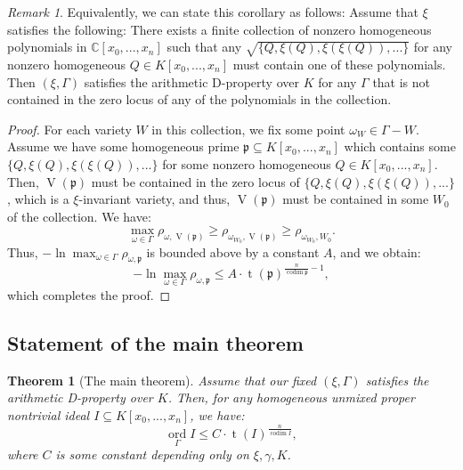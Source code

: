 \documentclass[reqno]{amsart}
\theoremstyle{plain}
\newtheorem{ThmCor}[Cor]{Theorem}
\theoremstyle{definition}
\theoremstyle{remark}
\newtheorem{Rem}[Cor]{Remark}
\theoremstyle{plain}
\begin{document}
\begin{Rem}
Equivalently, we can state this corollary as follows:
Assume that $\xi$ satisfies the following:
There exists a finite collection of nonzero homogeneous polynomials in $\mathbb C[x_0,...,x_n]$ such that any $\sqrt{\{Q,\xi(Q),\xi(\xi(Q)),...\}}$ for any nonzero homogeneous  $Q\in K[x_0,...,x_n]$ must contain one of these polynomials.
Then $(\xi,\Gamma)$ satisfies the arithmetic D-property over $K$ for any $\Gamma$ that is not contained in the zero locus of any of the polynomials in the collection.
\end{Rem}

\begin{proof}
For each variety $W$ in this collection, we fix some point $\omega_W\in\Gamma-W$. Assume we have some homogeneous prime $\mathfrak p\subseteq K[x_0,...,x_n]$ which contains some $\{Q,\xi(Q),\xi(\xi(Q)),...\}$ for some nonzero homogeneous $Q\in K[x_0,...,x_n]$. Then, $\operatorname{V}(\mathfrak p)$ must be contained in the zero locus of $\{Q,\xi(Q),\xi(\xi(Q)),...\}$, which is a $\xi$-invariant variety, and thus, $\operatorname{V}(\mathfrak p)$ must be contained in some $W_0$ of the collection. We have:
\[
\max_{\omega\in\Gamma}\rho_{\omega,\operatorname{V}(\mathfrak p)}\geq\rho_{\omega_{W_0},\operatorname{V}(\mathfrak p)}\geq\rho_{\omega_{W_0},W_0}
.\]
Thus, $-\ln\max_{\omega\in\Gamma}\rho_{\omega,\mathfrak p}$ is bounded above by a constant $A$, and we obtain:
  \begin{equation*}
    -\ln\max_{\omega\in\Gamma}\rho_{\omega,\mathfrak p}\leq A \cdot \operatorname{t}(\mathfrak p)^{\frac n {\operatorname{codim}\mathfrak p}-1}
  ,\end{equation*}
which completes the proof.
\end{proof}

\subsection{Statement of the main theorem}

\begin{ThmCor}[The main theorem]\label{Theorem lower bound main theorem}
Assume that our fixed $(\xi,\Gamma)$ satisfies the arithmetic D-property over $K$. Then, for any homogeneous unmixed proper nontrivial ideal $I\subseteq K[x_0,...,x_n]$, we have:
\[
    \operatorname*{ord}_{\Gamma}I
        \leq
    C\cdot\operatorname{t}(I)^\frac{n}{\operatorname{codim}I}
,\]
where $C$ is some constant depending only on $\xi,\gamma,K$.
\end{ThmCor}
\end{document}
